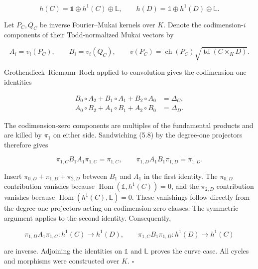 \documentclass[11pt,a4paper]{article}
\begin{document}
\begin{equation*}
h(C)=\mathbb 1\oplus h^1(C)\oplus\mathbb L,
\qquad
h(D)=\mathbb 1\oplus h^1(D)\oplus\mathbb L.
\end{equation*}

Let $P_C,Q_C$ be inverse Fourier--Mukai kernels over $K$. Denote the codimension-$i$ components of their Todd-normalized Mukai vectors by

\begin{equation*}
A_i=v_i(P_C),\qquad B_i=v_i(Q_C),
\qquad
v(P_C)=\operatorname{ch}(P_C)\sqrt{\operatorname{td}(C\times_K D)}.
\end{equation*}

Grothendieck--Riemann--Roch applied to convolution gives the codimension-one identities \cite{Orl05}

\begin{equation*}
\begin{aligned}
B_0\circ A_2+B_1\circ A_1+B_2\circ A_0&=\Delta_C,\\
A_0\circ B_2+A_1\circ B_1+A_2\circ B_0&=\Delta_D.
\end{aligned}
\tag{5.8}
\end{equation*}

The codimension-zero components are multiples of the fundamental products and are killed by $\pi_1$ on either side. Sandwiching (5.8) by the degree-one projectors therefore gives

\begin{equation*}
\pi_{1,C}B_1A_1\pi_{1,C}=\pi_{1,C},
\qquad
\pi_{1,D}A_1B_1\pi_{1,D}=\pi_{1,D}.
\end{equation*}

Insert $\pi_{0,D}+\pi_{1,D}+\pi_{2,D}$ between $B_1$ and $A_1$ in the first identity. The $\pi_{0,D}$ contribution vanishes because $\operatorname{Hom}(\mathbb 1,h^1(C))=0$, and the $\pi_{2,D}$ contribution vanishes because $\operatorname{Hom}(h^1(C),\mathbb L)=0$. These vanishings follow directly from the degree-one projectors acting on codimension-zero classes. The symmetric argument applies to the second identity. Consequently,

\begin{equation*}
\pi_{1,D}A_1\pi_{1,C}:h^1(C)\longrightarrow h^1(D),
\qquad
\pi_{1,C}B_1\pi_{1,D}:h^1(D)\longrightarrow h^1(C)
\end{equation*}

are inverse. Adjoining the identities on $\mathbb 1$ and $\mathbb L$ proves the curve case. All cycles and morphisms were constructed over $K$. $\square$
\end{document}
